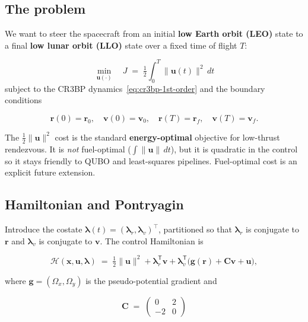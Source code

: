 \documentclass[8pt,a4paper]{article}
\newcommand{\bvec}[1]{\bm{#1}}
\newcommand{\xvec}{\bvec{x}}
\newcommand{\uvec}{\bvec{u}}
\newcommand{\lamr}{\bvec{\lambda}_r}
\newcommand{\lamv}{\bvec{\lambda}_v}
\newcommand{\Omegax}{\Omega_x}
\newcommand{\Omegay}{\Omega_y}
\newcommand{\TT}{^{\mathsf{T}}}
\theoremstyle{definition}
\theoremstyle{remark}
\begin{document}
\subsection{The problem}

We want to steer the spacecraft from an initial \textbf{low Earth orbit
(LEO)} state to a final \textbf{low lunar orbit (LLO)} state over a
fixed time of flight $T$:

\begin{equation}
  \min_{\uvec(\cdot)} \quad
    J \;=\; \tfrac12 \int_0^T \|\uvec(t)\|^2\, dt
\end{equation}
subject to the CR3BP dynamics~\eqref{eq:cr3bp-1st-order} and the
boundary conditions

\begin{equation}
  \bvec{r}(0) = \bvec{r}_0,\quad
  \bvec{v}(0) = \bvec{v}_0,\quad
  \bvec{r}(T) = \bvec{r}_f,\quad
  \bvec{v}(T) = \bvec{v}_f.
\label{eq:bcs}
\end{equation}

The $\tfrac12 \|\uvec\|^2$ cost is the standard \textbf{energy-optimal}
objective for low-thrust rendezvous. It is \emph{not} fuel-optimal
($\int \|\uvec\|\,dt$), but it is quadratic in the control so it stays
friendly to QUBO and least-squares pipelines. Fuel-optimal cost is an
explicit future extension.

\subsection{Hamiltonian and Pontryagin}

Introduce the costate $\bvec{\lambda}(t) = (\lamr, \lamv)^\top$,
partitioned so that $\lamr$ is conjugate to $\bvec{r}$ and $\lamv$
is conjugate to $\bvec{v}$. The control Hamiltonian is

\begin{equation}
  \mathcal{H}(\xvec, \uvec, \bvec{\lambda})
   \;=\;
   \tfrac12 \|\uvec\|^2
   + \lamr\TT \bvec{v}
   + \lamv\TT \Big( \bvec{g}(\bvec{r}) + \bvec{C} \bvec{v} + \uvec \Big),
\end{equation}

where $\bvec{g} = (\Omegax, \Omegay)$ is the pseudo-potential
gradient and

\begin{equation}
  \bvec{C} \;=\;
  \begin{pmatrix}
    0 & 2 \\ -2 & 0
  \end{pmatrix}
\end{equation}
\end{document}
